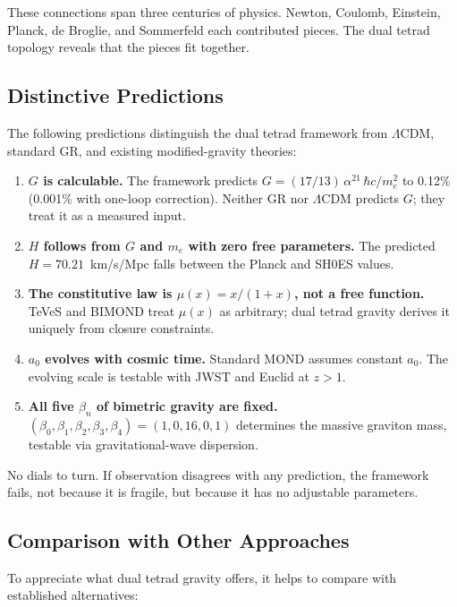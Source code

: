 \documentclass[aps,prd,preprint,superscriptaddress,showpacs,preprintnumbers,amsmath,amssymb,nofootinbib]{revtex4-2}
\begin{document}
These connections span three centuries of physics. Newton, Coulomb, Einstein, Planck, de Broglie, and Sommerfeld each contributed pieces. The dual tetrad topology reveals that the pieces fit together.

\subsection{Distinctive Predictions}
\label{subsec:predictions}

The following predictions distinguish the dual tetrad framework from $\Lambda$CDM, standard GR, and existing modified-gravity theories:
\begin{enumerate}[leftmargin=2em]
\item \textbf{$G$ is calculable.} The framework predicts $G = (17/13)\,\alpha^{21}\,\hbar c/m_e^2$ to 0.12\% (0.001\% with one-loop correction). Neither GR nor $\Lambda$CDM predicts $G$; they treat it as a measured input.
\item \textbf{$H$ follows from $G$ and $m_e$ with zero free parameters.} The predicted $H = 70.21$~km/s/Mpc falls between the Planck and SH0ES values.
\item \textbf{The constitutive law is $\mu(x) = x/(1+x)$, not a free function.} TeVeS and BIMOND treat $\mu(x)$ as arbitrary; dual tetrad gravity derives it uniquely from closure constraints.
\item \textbf{$a_0$ evolves with cosmic time.} Standard MOND assumes constant $a_0$. The evolving scale is testable with JWST and Euclid at $z > 1$.
\item \textbf{All five $\beta_n$ of bimetric gravity are fixed.} $(\beta_0,\beta_1,\beta_2,\beta_3,\beta_4) = (1,0,16,0,1)$ determines the massive graviton mass, testable via gravitational-wave dispersion.
\end{enumerate}

No dials to turn. If observation disagrees with any prediction, the framework fails, not because it is fragile, but because it has no adjustable parameters.

\subsection{Comparison with Other Approaches}
\label{subsec:comparison}

To appreciate what dual tetrad gravity offers, it helps to compare with established alternatives:
\end{document}
